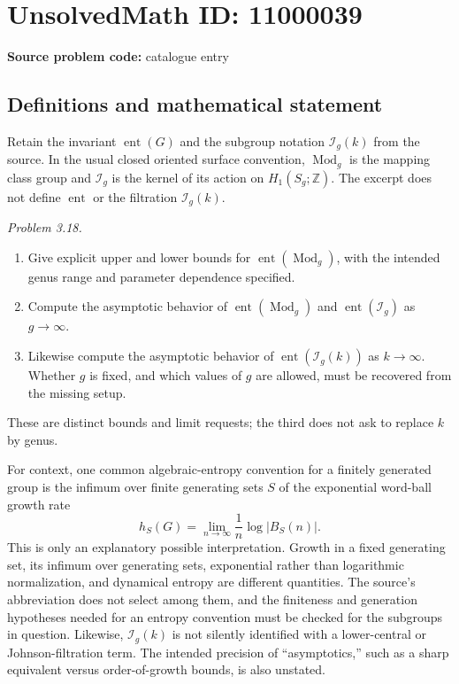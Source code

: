 \documentclass[11pt]{article}
\newcommand{\Z}{\mathbb{Z}}
\begin{document}
\section*{UnsolvedMath ID: 11000039}
\textbf{Source problem code:} catalogue entry
\subsection{Definitions and mathematical statement}
Retain the invariant \(\operatorname{ent}(G)\) and the subgroup notation \(\mathcal I_g(k)\) from the source. In the usual closed oriented surface convention, \(\operatorname{Mod}_g\) is the mapping class group and \(\mathcal I_g\) is the kernel of its action on \(H_1(S_g;\Z)\). The excerpt does not define \(\operatorname{ent}\) or the filtration \(\mathcal I_g(k)\).

\emph{Problem 3.18.}
\begin{enumerate}
\item Give explicit upper and lower bounds for \(\operatorname{ent}(\operatorname{Mod}_g)\), with the intended genus range and parameter dependence specified.
\item Compute the asymptotic behavior of \(\operatorname{ent}(\operatorname{Mod}_g)\) and \(\operatorname{ent}(\mathcal I_g)\) as \(g\to\infty\).
\item Likewise compute the asymptotic behavior of \(\operatorname{ent}(\mathcal I_g(k))\) as \(k\to\infty\). Whether \(g\) is fixed, and which values of \(g\) are allowed, must be recovered from the missing setup.
\end{enumerate}
These are distinct bounds and limit requests; the third does not ask to replace \(k\) by genus.

For context, one common algebraic-entropy convention for a finitely generated group is the infimum over finite generating sets \(S\) of the exponential word-ball growth rate
\[
 h_S(G)=\lim_{n\to\infty}\frac{1}{n}\log|B_S(n)|.
\]
This is only an explanatory possible interpretation. Growth in a fixed generating set, its infimum over generating sets, exponential rather than logarithmic normalization, and dynamical entropy are different quantities. The source's abbreviation does not select among them, and the finiteness and generation hypotheses needed for an entropy convention must be checked for the subgroups in question. Likewise, \(\mathcal I_g(k)\) is not silently identified with a lower-central or Johnson-filtration term. The intended precision of ``asymptotics,'' such as a sharp equivalent versus order-of-growth bounds, is also unstated.
\end{document}
